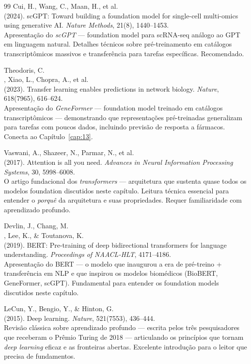 \begin{thebibliography}{99}
 Cui, H., Wang, C., Maan, H., et al.\\ (2024). scGPT: Toward building a foundation model for single-cell multi-omics using generative AI. \emph{Nature Methods}, 21(8), 1440--1453.\\ Apresentação do \emph{scGPT} --- foundation model para scRNA-seq análogo ao GPT em linguagem natural. Detalhes técnicos sobre pré-treinamento em catálogos transcriptômicos massivos e transferência para tarefas específicas. Recomendado.

 Theodoris, C.\\, Xiao, L., Chopra, A., et al.\\ (2023). Transfer learning enables predictions in network biology. \emph{Nature}, 618(7965), 616--624.\\ Apresentação do \emph{GeneFormer} --- foundation model treinado em catálogos transcriptômicos --- demonstrando que representações pré-treinadas generalizam para tarefas com poucos dados, incluindo previsão de resposta a fármacos. Conecta ao Capítulo~\ref{cap:13}.

 Vaswani, A., Shazeer, N., Parmar, N., et al.\\ (2017). Attention is all you need. \emph{Advances in Neural Information Processing Systems}, 30, 5998--6008.\\ O artigo fundacional dos \emph{transformers} --- arquitetura que sustenta quase todos os modelos foundation discutidos neste capítulo. Leitura técnica essencial para entender o \emph{porquê} da arquitetura e suas propriedades. Requer familiaridade com aprendizado profundo.

 Devlin, J., Chang, M.\\, Lee, K., \& Toutanova, K.\\ (2019). BERT: Pre-training of deep bidirectional transformers for language understanding. \emph{Proceedings of NAACL-HLT}, 4171--4186.\\ Apresentação do BERT --- o modelo que inaugurou a era de pré-treino + transferência em NLP e que inspirou os modelos biomédicos (BioBERT, GeneFormer, scGPT). Fundamental para entender os foundation models discutidos neste capítulo.

 LeCun, Y., Bengio, Y., \& Hinton, G.\\ (2015). Deep learning. \emph{Nature}, 521(7553), 436--444.\\ Revisão clássica sobre aprendizado profundo --- escrita pelos três pesquisadores que receberam o Prêmio Turing de 2018 --- articulando os princípios que tornam \emph{deep learning} eficaz e as fronteiras abertas. Excelente introdução para o leitor que precisa de fundamentos.


\end{thebibliography}
